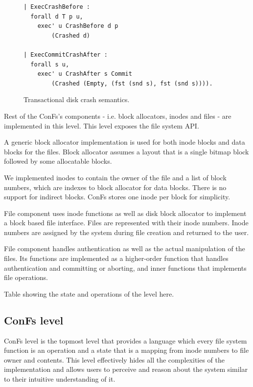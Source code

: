 \begin{figure}[ht]
    \centering
\begin{verbatim}
| ExecCrashBefore :
  forall d T p u,
    exec' u CrashBefore d p 
        (Crashed d)

| ExecCommitCrashAfter :
  forall s u,
    exec' u CrashAfter s Commit 
        (Crashed (Empty, (fst (snd s), fst (snd s)))).
\end{verbatim}
    \caption{Transactional disk crash semantics.}
    \label{fig:TD_Crash_Semantics}
\end{figure}

Rest of the ConFs's components - i.e. block allocators, inodes and files - are implemented in this level. This level exposes the file system API.

A generic block allocator implementation is used for both inode blocks and data blocks for the files. Block allocator assumes a layout that is a single bitmap block followed by some allocatable blocks.

We implemented inodes to contain the owner of the file and a list of block numbers, which are indexes to block allocator for data blocks. There is no support for indirect blocks. ConFs stores one inode per block for simplicity.

File component uses inode functions as well as disk block allocator to implement a block based file interface. Files are represented with their inode numbers. Inode numbers are assigned by the system during file creation and returned to the user.

File component handles authentication as well as the actual manipulation of the files. Its functions are implemented as a higher-order function that handles authentication and committing or aborting, and inner functions that implements file operations.

{\color{red} Table showing the state and operations of the level here}.

\subsection{ConFs level}
ConFs level is the topmost level that provides a language which every file system function is an operation and a state that is a mapping from inode numbers to file owner and contents. This level effectively hides all the complexities of the implementation and allows users to perceive and reason about the system similar to their intuitive understanding of it.

